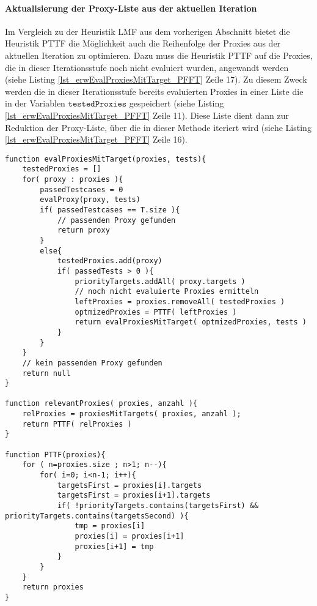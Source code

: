 \paragraph{Aktualisierung der Proxy-Liste aus der aktuellen Iteration}
\noindent
\newline
Im Vergleich zu der Heuristik LMF aus dem vorherigen Abschnitt bietet die Heuristik PTTF die Möglichkeit auch die Reihenfolge der Proxies aus der aktuellen Iteration zu optimieren. Dazu muss die Heuristik PTTF auf die Proxies, die in dieser Iterationsstufe noch nicht evaluiert wurden, angewandt werden (siehe Listing \ref{lst_erwEvalProxiesMitTarget_PFFT} Zeile 17). Zu diesem Zweck werden die in dieser Iterationsstufe bereits evaluierten Proxies in einer Liste die in der Variablen $\texttt{testedProxies}$ gespeichert (siehe Listing \ref{lst_erwEvalProxiesMitTarget_PFFT} Zeile 11). Diese Liste dient dann zur Reduktion der Proxy-Liste, über die in dieser Methode iteriert wird (siehe Listing \ref{lst_erwEvalProxiesMitTarget_PFFT} Zeile 16). 
\begin{lstlisting}[style = pseudo, caption = Auswertung des Testergebnisses mit Heuristik PTTF, captionpos = b, label = lst_erwEvalProxiesMitTarget_PFFT]
function evalProxiesMitTarget(proxies, tests){
	testedProxies = []
	for( proxy : proxies ){
		passedTestcases = 0
		evalProxy(proxy, tests)
		if( passedTestcases == T.size ){
			// passenden Proxy gefunden
			return proxy
		}
		else{
			testedProxies.add(proxy)
			if( passedTests > 0 ){
				priorityTargets.addAll( proxy.targets )
				// noch nicht evaluierte Proxies ermitteln
				leftProxies = proxies.removeAll( testedProxies )
				optmizedProxies = PTTF( leftProxies )
				return evalProxiesMitTarget( optmizedProxies, tests )
			}
		}
	}
	// kein passenden Proxy gefunden
	return null
}

function relevantProxies( proxies, anzahl ){
	relProxies = proxiesMitTargets( proxies, anzahl );
	return PTTF( relProxies )
} 

function PTTF(proxies){
	for	( n=proxies.size ; n>1; n--){
		for( i=0; i<n-1; i++){
			targetsFirst = proxies[i].targets
			targetsFirst = proxies[i+1].targets			
			if( !priorityTargets.contains(targetsFirst) && priorityTargets.contains(targetsSecond) ){
				tmp = proxies[i]
				proxies[i] = proxies[i+1]
				proxies[i+1] = tmp
			}
		}
	}
	return proxies	
}
\end{lstlisting}

